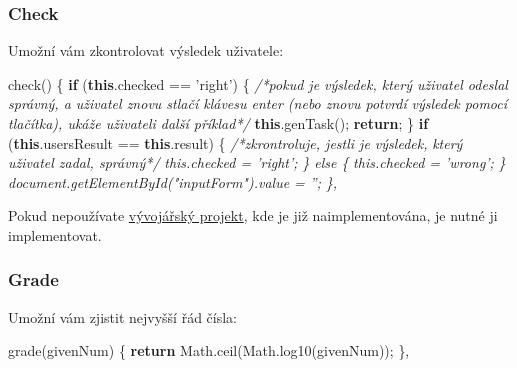 \documentclass[
]{article}
\newenvironment{Shaded}{}{}
\newcommand{\AttributeTok}[1]{\textcolor[rgb]{0.49,0.56,0.16}{#1}}
\newcommand{\CommentTok}[1]{\textcolor[rgb]{0.38,0.63,0.69}{\textit{#1}}}
\newcommand{\ControlFlowTok}[1]{\textcolor[rgb]{0.00,0.44,0.13}{\textbf{#1}}}
\newcommand{\KeywordTok}[1]{\textcolor[rgb]{0.00,0.44,0.13}{\textbf{#1}}}
\newcommand{\NormalTok}[1]{#1}
\newcommand{\OperatorTok}[1]{\textcolor[rgb]{0.40,0.40,0.40}{#1}}
\newcommand{\StringTok}[1]{\textcolor[rgb]{0.25,0.44,0.63}{#1}}
\newcommand{\VariableTok}[1]{\textcolor[rgb]{0.10,0.09,0.49}{#1}}
\begin{document}
\hypertarget{check}{%
\subsubsection{Check}\label{check}}

Umožní vám zkontrolovat výsledek uživatele:

\begin{Shaded}
\begin{Highlighting}[]
\AttributeTok{check}\NormalTok{() }\OperatorTok{\{}
    \ControlFlowTok{if}\NormalTok{ (}\KeywordTok{this}\NormalTok{.}\AttributeTok{checked} \OperatorTok{==} \StringTok{'right'}\NormalTok{) }\OperatorTok{\{} \CommentTok{/*pokud je výsledek, který uživatel odeslal }
\CommentTok{        správný, a uživatel znovu stlačí klávesu enter (nebo znovu potvrdí }
\CommentTok{        výsledek pomocí tlačítka), ukáže uživateli další příklad*/}
        \KeywordTok{this}\NormalTok{.}\AttributeTok{genTask}\NormalTok{()}\OperatorTok{;}
        \ControlFlowTok{return}\OperatorTok{;}
    \OperatorTok{\}}
    \ControlFlowTok{if}\NormalTok{ (}\KeywordTok{this}\NormalTok{.}\AttributeTok{usersResult} \OperatorTok{==} \KeywordTok{this}\NormalTok{.}\AttributeTok{result}\NormalTok{) }\OperatorTok{\{} \CommentTok{/*zkrontroluje, jestli je výsledek, }
\CommentTok{        který uživatel zadal, správný*/}
\CommentTok{        this.checked = 'right';}
\CommentTok{    \} else \{}
\CommentTok{        this.checked = 'wrong';}
\CommentTok{    \}}
\CommentTok{    document.getElementById("inputForm").value = '';}
\CommentTok{\},}
\end{Highlighting}
\end{Shaded}

Pokud nepoužívate
\href{https://github.com/kubajj/ComputatisDevelopmentProject}{vývojářský
projekt}, kde je již naimplementována, je nutné ji implementovat.

\hypertarget{grade}{%
\subsubsection{Grade}\label{grade}}

Umožní vám zjistit nejvyšší řád čísla:

\begin{Shaded}
\begin{Highlighting}[]
\AttributeTok{grade}\NormalTok{(givenNum) }\OperatorTok{\{}
    \ControlFlowTok{return} \VariableTok{Math}\NormalTok{.}\AttributeTok{ceil}\NormalTok{(}\VariableTok{Math}\NormalTok{.}\AttributeTok{log10}\NormalTok{(givenNum))}\OperatorTok{;}
\OperatorTok{\},}
\end{Highlighting}
\end{Shaded}
\end{document}
